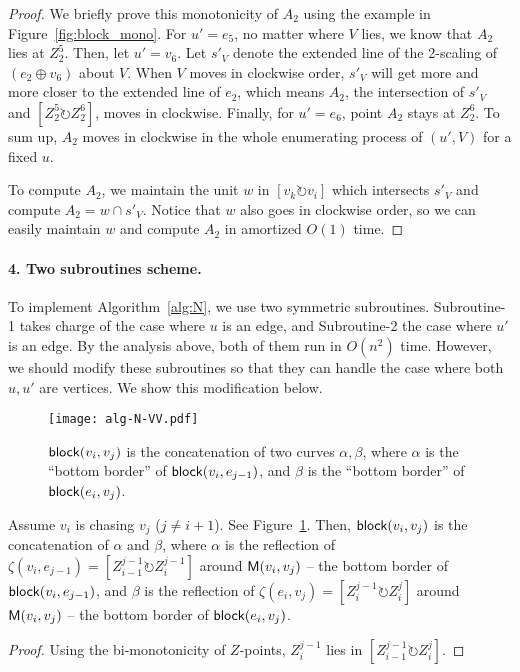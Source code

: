 \documentclass{ws-ijcga}
\begin{document}
\begin{proof}
We briefly prove this monotonicity of $A_2$ using the example in Figure~\ref{fig:block_mono}.
For $u'=e_5$, no matter where $V$ lies, we know that $A_2$ lies at $Z_2^5$.
Then, let $u'=v_6$. Let $s'_V$ denote the extended line of the 2-scaling of $(e_2\oplus v_6)$ about $V$.
When $V$ moves in clockwise order, $s'_V$ will get more and more closer to the extended line of $e_2$, which means $A_2$,
   the intersection of $s'_{V}$ and $[Z_2^5\circlearrowright Z_2^6]$, moves in clockwise.
   Finally, for $u'=e_6$, point $A_2$ stays at $Z_2^6$.
   To sum up, $A_2$ moves in clockwise in the whole enumerating process of $(u',V)$ for a fixed $u$.

To compute $A_2$, we maintain the unit $w$ in $[v_k\circlearrowright v_i]$ which intersects $s'_V$ and compute $A_2=w\cap s'_V$.
  Notice that $w$ also goes in clockwise order, so we can easily maintain $w$ and compute $A_2$ in amortized $O(1)$ time.
 \end{proof}

\paragraph{4. Two subroutines scheme.} To implement Algorithm~\ref{alg:N}, we use two symmetric subroutines.
Subroutine-1 takes charge of the case where $u$ is an edge, and Subroutine-2 the case where $u'$ is an edge.
By the analysis above, both of them run in $O(n^2)$ time.
However, we should modify these subroutines so that they can handle the case where both $u,u'$ are vertices.
We show this modification below.

\begin{figure}[h]
\centering\texttt{[image: alg-N-VV.pdf]}
\caption{$\mathsf{block}(v_i,v_j)$ is the concatenation of two curves $\alpha,\beta$, where $\alpha$ is the ``bottom border'' of $\mathsf{block}(v_i,e_{j-1})$, and
 $\beta$ is the ``bottom border'' of $\mathsf{block}(e_i,v_j)$.}\label{fig:alg-N-VV}
\end{figure}

\begin{claim}\label{claim:border}
     Assume $v_i$ is chasing $v_j$ ($j\neq i+1$). See Figure~\ref{fig:alg-N-VV}.
     Then, $\mathsf{block}(v_i,v_j)$ is the concatenation of $\alpha$ and $\beta$,
       where $\alpha$ is the reflection of $\zeta(v_i,e_{j-1})=[Z_{i-1}^{j-1}\circlearrowright Z_i^{j-1}]$ around $\mathsf{M}(v_i,v_j)$
         -- the bottom border of $\mathsf{block}(v_i,e_{j-1})$,
       and $\beta$ is the reflection of $\zeta(e_i,v_j)=[Z_i^{j-1} \circlearrowright Z_i^j]$ around $\mathsf{M}(v_i,v_j)$
         -- the bottom border of $\mathsf{block}(e_i,v_j)$.
\end{claim}
\begin{proof}
 Using the bi-monotonicity of $Z$-points, $Z_i^{j-1}$ lies in $[Z_{i-1}^{j-1}\circlearrowright Z_i^j]$.
  \end{proof}
\end{document}
